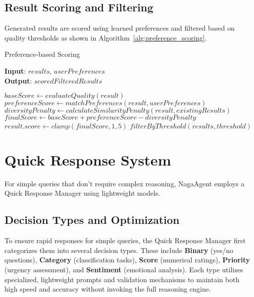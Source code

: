 \documentclass[letterpaper]{article} %
\begin{document}
\subsection{Result Scoring and Filtering}

Generated results are scored using learned preferences and filtered based on quality thresholds as shown in Algorithm~\ref{alg:preference_scoring}.

\begin{algorithm}[tb]
\caption{Preference-based Scoring}
\label{alg:preference_scoring}
\textbf{Input}: $\mathit{results}$, $\mathit{userPreferences}$\\
\textbf{Output}: $\mathit{scoredFilteredResults}$
\begin{algorithmic}[1]
    \State $\mathit{baseScore} \gets \mathit{evaluateQuality}(\mathit{result})$
    \State $\mathit{preferenceScore} \gets \mathit{matchPreferences}(\mathit{result}, \mathit{userPreferences})$
    \State $\mathit{diversityPenalty} \gets \mathit{calculateSimilarityPenalty}(\mathit{result}, \mathit{existingResults})$
    \State $\mathit{finalScore} \gets \mathit{baseScore} + \mathit{preferenceScore} - \mathit{diversityPenalty}$
    \State $\mathit{result.score} \gets \mathit{clamp}(\mathit{finalScore}, 1, 5)$
\EndFor
\State \Return $\mathit{filterByThreshold}(\mathit{results}, \mathit{threshold})$
\end{algorithmic}
\end{algorithm}

\section{Quick Response System}

For simple queries that don't require complex reasoning, NagaAgent employs a Quick Response Manager using lightweight models.

\subsection{Decision Types and Optimization}

To ensure rapid responses for simple queries, the Quick Response Manager first categorizes them into several decision types. These include {\bfseries Binary} (yes/no questions), {\bfseries Category} (classification tasks), {\bfseries Score} (numerical ratings), {\bfseries Priority} (urgency assessment), and {\bfseries Sentiment} (emotional analysis). Each type utilizes specialized, lightweight prompts and validation mechanisms to maintain both high speed and accuracy without invoking the full reasoning engine.
\end{document}
